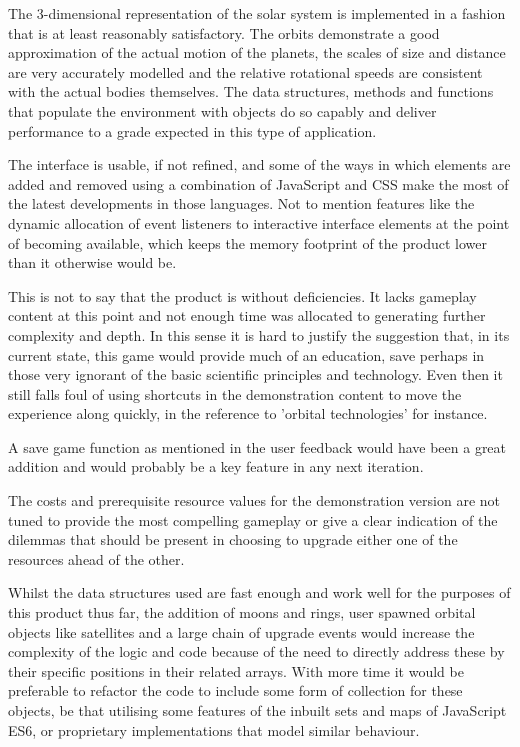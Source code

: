 \documentclass[twoside]{bhamthesis}
\begin{document}
The 3-dimensional representation of the solar system is implemented in a fashion that is at least reasonably satisfactory. The orbits demonstrate a good approximation of the actual motion of the planets,  the scales of size and distance are very accurately modelled and the relative rotational speeds are consistent with the actual bodies themselves. The data structures, methods and functions that populate the environment with objects do so capably and deliver performance to a grade expected in this type of application.

The interface is usable, if not refined, and some of the ways in which elements are added and removed using a combination of JavaScript and CSS make the most of the latest developments in those languages. Not to mention features like the dynamic allocation of event listeners to interactive interface elements at the point of becoming available, which keeps the memory footprint of the product lower than it otherwise would be.

This is not to say that the product is without deficiencies. It lacks gameplay content at this point and not enough time was allocated to generating further complexity and depth. In this sense it is hard to justify the suggestion that, in its current state, this game would provide much of an education, save perhaps in those very ignorant of the basic scientific principles and technology. Even then it still falls foul of using shortcuts in the demonstration content to move the experience along quickly, in the reference to 'orbital technologies' for instance.

A save game function as mentioned in the user feedback would have been a great addition and would probably be a key feature in any next iteration.

The costs and prerequisite resource values for the demonstration version are not tuned to provide the most compelling gameplay or give a clear indication of the dilemmas that should be present in choosing to upgrade either one of the resources ahead of the other.

Whilst the data structures used are fast enough and work well for the purposes of this product thus far, the addition of moons and rings, user spawned orbital objects like satellites and a large chain of upgrade events would increase the complexity of the logic and code because of the need to directly address these by their specific positions in their related arrays. With more time it would be preferable to refactor the code to include some form of collection for these objects, be that utilising some features of the inbuilt sets and maps of JavaScript ES6, or proprietary implementations that model similar behaviour.
\end{document}
